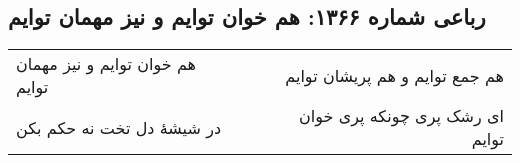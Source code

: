 \begin{center}
\section*{رباعی شماره ۱۳۶۶: هم خوان توایم و نیز مهمان توایم}
\label{sec:1366}
\begin{longtable}{l p{0.5cm} r}
هم خوان توایم و نیز مهمان توایم
&&
هم جمع توایم و هم پریشان توایم
\\
در شیشهٔ دل تخت نه حکم بکن
&&
ای رشک پری چونکه پری خوان توایم
\\
\end{longtable}
\end{center}
